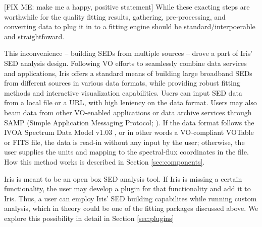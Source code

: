[FIX ME: make me a happy, positive statement] While these exacting steps are worthwhile for the quality fitting results, gathering, pre-processing, and converting data to plug it in to a fitting engine should be standard/interpoerable and straightfoward. 

This inconvenience -- building SEDs from multiple sources -- drove a part of Iris' SED analysis design. Following VO efforts to seamlessly combine data services and applications, Iris offers a standard means of building large broadband SEDs from different sources in various data formats, while providing robust fitting methods and interactive visualization capabilities. Users can input SED data from a local file or a URL, with high leniency on the data format. Users may also beam data from other VO-enabled applications or data archive services through SAMP (Simple Application Messaging Protocol; \citet{2011arXiv1110.0528T}). If the data format follows the IVOA Spectrum Data Model v1.03 \citep{2012arXiv1204.3055M}, or in other words a VO-compliant VOTable or FITS file, the data is read-in without any input by the user; otherwise, the user supplies the units and  mapping to the spectral-flux coordinates in the file. How this method works is described in Section \ref{sec:components}.

Iris is meant to be an open box SED analysis tool. If Iris is missing a certain functionality, the user may develop a plugin for that functionality and add it to Iris. Thus, a user can employ Iris' SED building capabilites while running custom analysis, which in theory could be one of the fitting packages discussed above. We explore this possibility in detail in Section \ref{sec:plugins}



%

